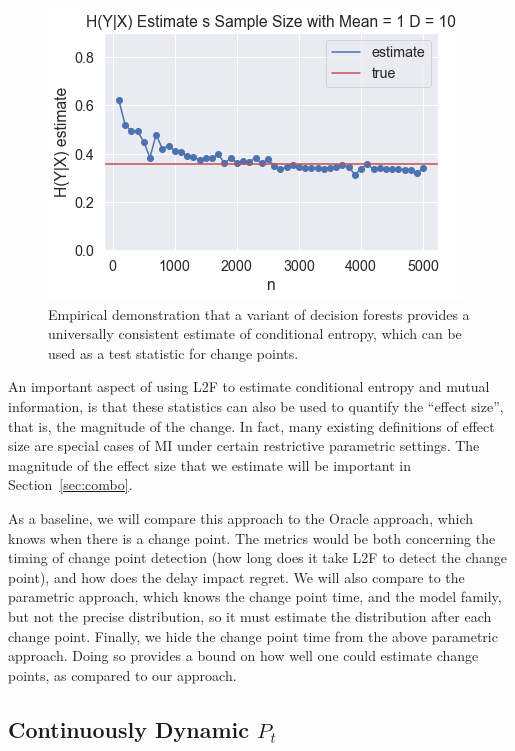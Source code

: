 \documentclass{article}
\begin{document}
\begin{figure}
    \centering
    \includegraphics{cond_entropy.png}
    \caption{Empirical demonstration that a variant of decision forests provides a universally consistent estimate of conditional entropy, which can be used as a test statistic for change points.}
    \label{fig:cond_entropy}
\end{figure}

An important aspect of using L2F to estimate conditional entropy and mutual information, is that these statistics can also be used to quantify the ``effect size'', that is, the magnitude of the change.  In fact, many existing definitions of effect size are special cases of MI under certain restrictive parametric settings.  The magnitude of the effect size that we estimate will be important in Section~\ref{sec:combo}.


As a baseline, we will compare this approach to the Oracle approach, which knows when there is a change point.  The metrics would be both concerning the timing of change point detection (how long does it take L2F to detect the change point), and how does the delay impact regret. We will also compare to the parametric approach, which knows the change point time, and the model family, but not the precise distribution, so it must estimate the distribution after each change point. Finally, we hide the change point time from the above parametric approach. Doing so provides a bound on how well one could estimate change points, as compared to our approach. 




\subsection{Continuously Dynamic $P_t$}
\label{sec:smooth}
\end{document}
